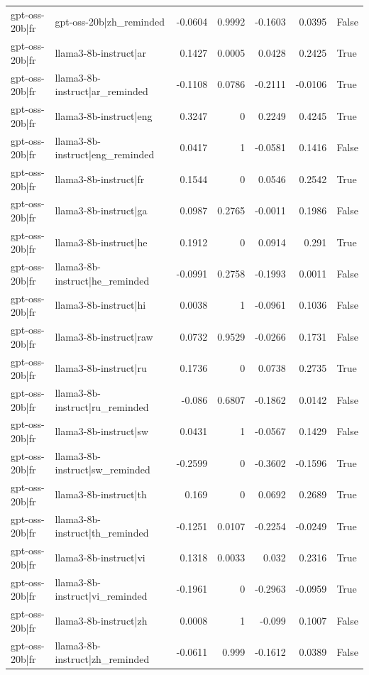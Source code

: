 \begin{table}
\begin{tabular}{l l r r r r l}
gpt-oss-20b|fr & gpt-oss-20b|zh_reminded & -0.0604 & 0.9992 & -0.1603 & 0.0395 & False \\
gpt-oss-20b|fr & llama3-8b-instruct|ar & 0.1427 & 0.0005 & 0.0428 & 0.2425 & True \\
gpt-oss-20b|fr & llama3-8b-instruct|ar_reminded & -0.1108 & 0.0786 & -0.2111 & -0.0106 & True \\
gpt-oss-20b|fr & llama3-8b-instruct|eng & 0.3247 & 0 & 0.2249 & 0.4245 & True \\
gpt-oss-20b|fr & llama3-8b-instruct|eng_reminded & 0.0417 & 1 & -0.0581 & 0.1416 & False \\
gpt-oss-20b|fr & llama3-8b-instruct|fr & 0.1544 & 0 & 0.0546 & 0.2542 & True \\
gpt-oss-20b|fr & llama3-8b-instruct|ga & 0.0987 & 0.2765 & -0.0011 & 0.1986 & False \\
gpt-oss-20b|fr & llama3-8b-instruct|he & 0.1912 & 0 & 0.0914 & 0.291 & True \\
gpt-oss-20b|fr & llama3-8b-instruct|he_reminded & -0.0991 & 0.2758 & -0.1993 & 0.0011 & False \\
gpt-oss-20b|fr & llama3-8b-instruct|hi & 0.0038 & 1 & -0.0961 & 0.1036 & False \\
gpt-oss-20b|fr & llama3-8b-instruct|raw & 0.0732 & 0.9529 & -0.0266 & 0.1731 & False \\
gpt-oss-20b|fr & llama3-8b-instruct|ru & 0.1736 & 0 & 0.0738 & 0.2735 & True \\
gpt-oss-20b|fr & llama3-8b-instruct|ru_reminded & -0.086 & 0.6807 & -0.1862 & 0.0142 & False \\
gpt-oss-20b|fr & llama3-8b-instruct|sw & 0.0431 & 1 & -0.0567 & 0.1429 & False \\
gpt-oss-20b|fr & llama3-8b-instruct|sw_reminded & -0.2599 & 0 & -0.3602 & -0.1596 & True \\
gpt-oss-20b|fr & llama3-8b-instruct|th & 0.169 & 0 & 0.0692 & 0.2689 & True \\
gpt-oss-20b|fr & llama3-8b-instruct|th_reminded & -0.1251 & 0.0107 & -0.2254 & -0.0249 & True \\
gpt-oss-20b|fr & llama3-8b-instruct|vi & 0.1318 & 0.0033 & 0.032 & 0.2316 & True \\
gpt-oss-20b|fr & llama3-8b-instruct|vi_reminded & -0.1961 & 0 & -0.2963 & -0.0959 & True \\
gpt-oss-20b|fr & llama3-8b-instruct|zh & 0.0008 & 1 & -0.099 & 0.1007 & False \\
gpt-oss-20b|fr & llama3-8b-instruct|zh_reminded & -0.0611 & 0.999 & -0.1612 & 0.0389 & False \\

\end{tabular}
\end{table}

